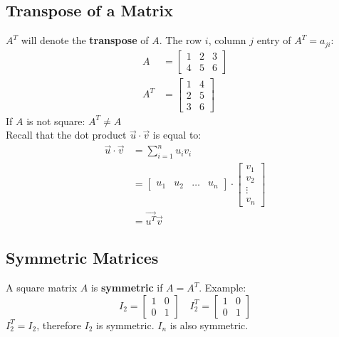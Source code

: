\documentclass{math}
\begin{document}
\subsection*{Transpose of a Matrix}
\( A^T \) will denote the \textbf{transpose} of \( A \). The row \( i \),
column \( j \) entry of \( A^T = a_{ji} \):
\begin{align*}
  A &= \begin{bmatrix}1 & 2 & 3 \\ 4 & 5 & 6\end{bmatrix} \\
  A^T &= \begin{bmatrix}1 & 4 \\ 2 & 5 \\ 3 & 6\end{bmatrix}
\end{align*}
If \( A \) is not square: \( A^T \ne A \) \\
Recall that the dot product \( \vec{u}\cdot\vec{v} \) is equal to:
\begin{align*}
  \vec{u}\cdot\vec{v} &= \sum_{i=1}^{n}u_iv_i \\
  &= \begin{bmatrix}u_1 & u_2 & \dots & u_n\end{bmatrix}\cdot
    \begin{bmatrix}v_1 \\ v_2 \\ \vdots \\ v_n\end{bmatrix} \\
  &= \vec{u^T}\vec{v}
\end{align*}

\subsection*{Symmetric Matrices}
A square matrix \( A \) is \textbf{symmetric} if \( A = A^T \). Example:
\[ I_2 = \begin{bmatrix}1 & 0 \\ 0 & 1\end{bmatrix}\quad
  I_2^T = \begin{bmatrix}1 & 0 \\ 0 & 1\end{bmatrix} \]
\( I_2^T = I_2 \), therefore \( I_2 \) is symmetric. \( I_n \) is also
symmetric.
\end{document}
